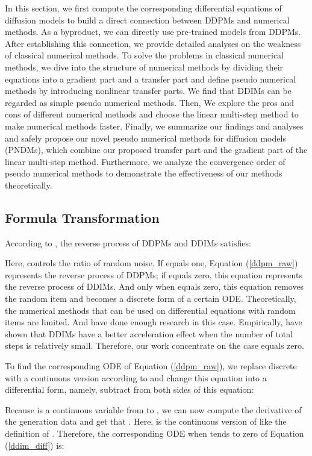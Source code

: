 \documentclass{article}
\begin{document}
In this section, we first compute the corresponding differential equations of diffusion models to build a direct connection between DDPMs and numerical methods. As a byproduct, we can directly use pre-trained models from DDPMs. After establishing this connection, we provide detailed analyses on the weakness of classical numerical methods. To solve the problems in classical numerical methods, we dive into the structure of numerical methods by dividing their equations into a gradient part and a transfer part and define pseudo numerical methods by introducing nonlinear transfer parts. We find that DDIMs can be regarded as simple pseudo numerical methods. Then, We explore the pros and cons of different numerical methods and choose the linear multi-step method to make numerical methods faster. Finally, we summarize our findings and analyses and safely propose our novel pseudo numerical methods for diffusion models (PNDMs), which combine our proposed transfer part and the gradient part of the linear multi-step method. Furthermore, we analyze the convergence order of pseudo numerical methods to demonstrate the effectiveness of our methods theoretically.



\subsection{Formula Transformation}
\label{formula_trans}
According to \citet{Song2020a}, the reverse process of DDPMs and DDIMs satisfies:

Here,  controls the ratio of random noise. If  equals one, Equation (\ref{ddpm_raw}) represents the reverse process of DDPMs; if  equals zero, this equation represents the reverse process of DDIMs. And only when  equals zero, this equation removes the random item and becomes a discrete form of a certain ODE. Theoretically, the numerical methods that can be used on differential equations with random items are limited. And \citet{Song2020} have done enough research in this case. Empirically, \citet{Song2020a} have shown that DDIMs have a better acceleration effect when the number of total steps is relatively small. Therefore, our work concentrate on the case  equals zero.

To find the corresponding ODE of Equation (\ref{ddpm_raw}), we replace discrete  with a continuous version  according to \citep{Song2020a} and change this equation into a differential form, namely, subtract  from both sides of this equation:

Because  is a continuous variable from  to , we can now compute the derivative of the generation data  and get that . Here,  is the continuous version of  like the definition of . Therefore, the corresponding ODE when  tends to zero of Equation (\ref{ddim_diff}) is:
\end{document}
